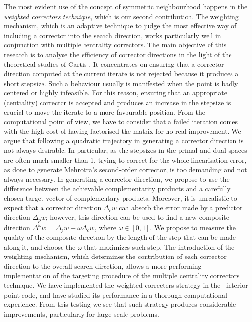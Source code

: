 The most evident use of the concept of symmetric neighbourhood
happens in the {\em weighted correctors technique},
which is our second contribution.
The weighting mechanism, which is an adaptive technique to judge the
most effective way of including a corrector into the search direction, 
works particularly well in conjunction with multiple centrality
correctors.
The main objective of this research is to analyse the efficiency of
corrector directions in the light of the theoretical studies of Cartis
\cite{Cartis04,Cartis05}. It concentrates on ensuring that a corrector
direction computed at the current iterate is not rejected because it
produces a short stepsize. Such a behaviour usually is manifested when
the point is badly centered or highly infeasible.
For this reason, ensuring that an appropriate (centrality) corrector
is accepted and produces an increase in the stepsize is crucial
to move the iterate to a more favourable position.
From the computational point of view, we have to consider that
a failed iteration comes with the high cost of having factorised
the matrix for no real improvement.
We argue that following a quadratic trajectory in generating a
corrector direction is not always desirable. In particular, as the stepsizes 
in the primal and dual spaces are often much smaller than 1,
trying to correct for the whole linearisation error,
as done to generate Mehrotra's second-order corrector, is too
demanding and not always necessary.
In generating a corrector direction, we propose to use 
the difference between the achievable complementarity products 
and a carefully chosen target vector of complementary products.
Moreover, it is unrealistic to expect that a corrector direction $\Delta_c w$
can absorb the error made by a predictor direction $\Delta_p w$;
however, this direction can be used to find a new composite
direction $\Delta^\omega w = \Delta_p w + \omega\Delta_c w$, where
$\omega \in [0,1]$.
We propose to measure the quality of the composite direction
by the length of the step that can be made along it, and choose
the $\omega$ that maximizes such step.
The introduction of the weighting mechanism, which determines
the contribution of each corrector direction to the overall
search direction, allows a more performing implementation
of the targeting procedure of the multiple centrality correctors technique.
We have implemented the weighted correctors strategy in the \HOPDM\
interior point code, and have studied its performance in a thorough
computational experience. 
From this testing we see that such strategy 
produces considerable improvements, particularly for large-scale
problems.

